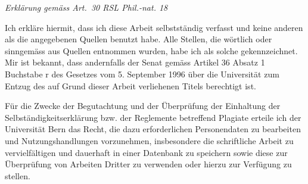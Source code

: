 \documentclass[a4paper,twoside,openright,11pt]{report}
\begin{document}
\emph{Erklärung gemäss Art.~30 RSL Phil.-nat. 18}

\vspace*{1cm}

\noindent
Ich erkläre hiermit, dass ich diese Arbeit selbstständig verfasst und keine
anderen als die angegebenen Quellen benutzt habe. Alle Stellen, die
wörtlich oder sinngemäss aus Quellen entnommen wurden, habe ich als solche
gekennzeichnet. Mir ist bekannt, dass andernfalls der Senat gemäss Artikel
36 Absatz 1 Buchstabe r des Gesetzes vom 5. September 1996 über die
Universität zum Entzug des auf Grund dieser Arbeit verliehenen Titels
berechtigt ist.

\vspace*{1cm}

\noindent
Für die Zwecke der Begutachtung und der Überprüfung der Einhaltung der
Selbständigkeitserklärung bzw.  der Reglemente betreffend Plagiate erteile
ich der Universität Bern das Recht, die dazu erforderlichen Personendaten
zu bearbeiten und Nutzungshandlungen vorzunehmen, insbesondere die
schriftliche Arbeit zu vervielfältigen und dauerhaft in einer Datenbank zu
speichern sowie diese zur Überprüfung von Arbeiten Dritter zu verwenden
oder hierzu zur Verfügung zu stellen.

\vspace*{5cm}

\par\noindent\makebox[6cm]{\hrulefill}   \hfill\makebox[8cm]{\hrulefill}
\par\noindent{} \hfill{}
\end{document}
